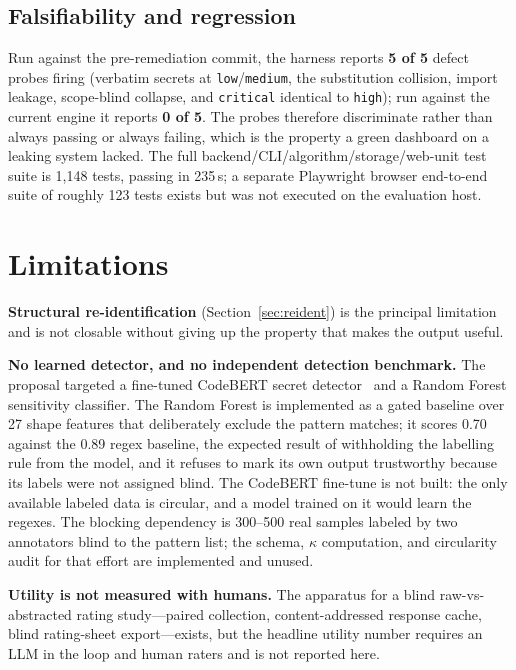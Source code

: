 \documentclass[conference]{IEEEtran}
\begin{document}
\subsection{Falsifiability and regression}

Run against the pre-remediation commit, the harness reports
\textbf{5 of 5} defect probes firing (verbatim secrets at
\texttt{low}/\texttt{medium}, the substitution collision, import leakage,
scope-blind collapse, and \texttt{critical} identical to \texttt{high});
run against the current engine it reports \textbf{0 of 5}. The probes
therefore discriminate rather than always passing or always failing, which
is the property a green dashboard on a leaking system lacked. The full
backend/CLI/algorithm/storage/web-unit test suite is 1{,}148 tests,
passing in 235\,s; a separate Playwright browser end-to-end suite of
roughly 123 tests exists but was not executed on the evaluation host.

\section{Limitations}
\label{sec:limits}

\textbf{Structural re-identification} (Section~\ref{sec:reident}) is the
principal limitation and is not closable without giving up the property
that makes the output useful.

\textbf{No learned detector, and no independent detection benchmark.} The
proposal targeted a fine-tuned CodeBERT secret
detector~\cite{feng2020codebert} and a Random Forest sensitivity
classifier. The Random Forest is implemented as a gated baseline over 27
shape features that deliberately exclude the pattern matches; it scores
0.70 against the 0.89 regex baseline, the expected result of withholding
the labelling rule from the model, and it refuses to mark its own output
trustworthy because its labels were not assigned blind. The CodeBERT
fine-tune is not built: the only available labeled data is circular, and a
model trained on it would learn the regexes. The blocking dependency is
300--500 real samples labeled by two annotators blind to the pattern list;
the schema, $\kappa$ computation, and circularity audit for that effort
are implemented and unused.

\textbf{Utility is not measured with humans.} The apparatus for a blind
raw-vs-abstracted rating study---paired collection, content-addressed
response cache, blind rating-sheet export---exists, but the headline
utility number requires an LLM in the loop and human raters and is not
reported here.
\end{document}
